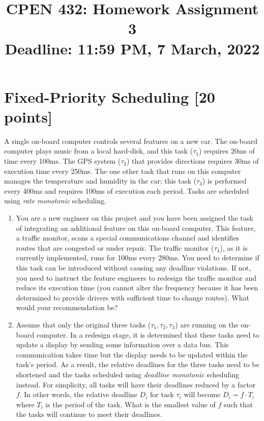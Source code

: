 \documentclass[12pt]{article}
\title{
  CPEN 432: Homework Assignment 3 \\
  \large
  Deadline: 11:59 PM, 7 March, 2022
}
\date{}
\begin{document}
\maketitle

\setlength{\baselineskip}{0.90\baselineskip}

\pagestyle{empty}

\section{Fixed-Priority Scheduling [20 points]}

A single on-board computer controls several features on a new car. The on-board
computer plays music from a local hard-disk, and this task ($\tau_{1}$)
requires 20ms of time every 100ms. The GPS system ($\tau_{2}$) that provides
directions requires 30ms of execution time every 250ms. The one other task that
runs on this computer manages the temperature and humidity in the car; this
task ($\tau_{3}$) is performed every 400ms and requires 100ms of execution
each period. Tasks are scheduled using \textit{rate monotonic} scheduling.

\begin{enumerate}

\item You are a new engineer on this project and you have been assigned the
task of integrating an additional feature on this on-board computer. This
feature, a traffic monitor, scans a special communications channel and
identifies routes that are congested or under repair. The traffic monitor
($\tau_{4}$), as it is currently implemented, runs for 100ms every 280ms.
You need to determine if this task can be introduced without causing any
deadline violations. If not, you need to instruct the feature engineers to
redesign the traffic monitor and reduce its execution time (you cannot alter
the frequency because it has been determined to provide drivers with
sufficient time to change routes). What would your recommendation be?

\item Assume that only the original three tasks ($\tau_{1}, \tau_{2}, \tau_{3}$)
are running on the on-board computer. In a redesign stage, it is determined that
these tasks need to update a display by sending some information over a data
bus. This communication takes time but the display needs to be updated within
the task's period. As a result, the relative deadlines for the three tasks
need to be shortened and the tasks scheduled using \textit{deadline monotonic}
scheduling instead. For simplicity, all tasks will have their
deadlines reduced by a factor $f$. In other words, the relative deadline
$D_{i}$ for task $\tau_{i}$ will become $D_{i} = f{\cdot}T_{i}$ where $T_{i}$ is
the period of the task. What is the smallest value of $f$ such that the tasks
will continue to meet their deadlines.

\end{enumerate}
\end{document}
